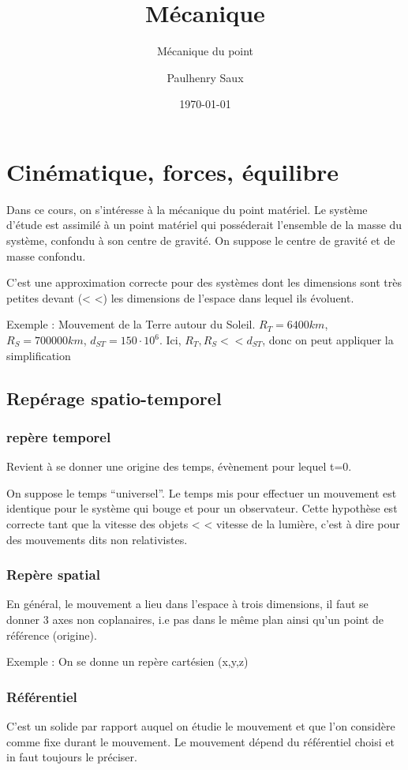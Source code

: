 \documentclass[french]{yLectureNote}
\title{Mécanique}
\subtitle{Mécanique du point}
\author{Paulhenry Saux}
\date{\today}
\begin{document}
\setcounter{chapter}{1}
	\chapter{Cinématique, forces, équilibre }
Dans ce cours, on s'intéresse à la mécanique du point matériel. Le système d'étude est assimilé à un point matériel qui posséderait l'ensemble de la masse du système, confondu à son centre de gravité. On suppose le centre de gravité et de masse confondu.

C'est une approximation correcte pour des systèmes dont les dimensions sont très petites devant (< <)  les dimensions de l'espace dans lequel ils évoluent.

Exemple : Mouvement de la Terre autour du Soleil. $R_T = 6400 km$, $R_S = 700 000 km$, $d_{ST} = 150\cdot 10^6$. Ici, $R_T, R_S << d_{ST}$, donc on peut appliquer la simplification

\section{Repérage spatio-temporel}
\subsection{repère temporel}
Revient à se donner une origine des temps, évènement pour lequel t=0.
\begin{theorem}[Hypothèse]
On suppose le temps ``universel''. Le temps mis pour effectuer un mouvement est identique pour le système qui bouge et pour un observateur. Cette hypothèse est correcte tant que la vitesse des objets < < vitesse de la lumière, c'est à dire pour des mouvements dits non relativistes.
\end{theorem}

\subsection{Repère spatial}
En général, le mouvement a lieu dans l'espace à trois dimensions, il faut se donner 3 axes non coplanaires, i.e pas dans le même plan ainsi qu'un point de référence (origine).

Exemple : On se donne un repère cartésien (x,y,z)

\subsection{Référentiel}

C'est un solide par rapport auquel on étudie le mouvement et que l'on considère comme fixe durant le mouvement. Le mouvement dépend du référentiel choisi et in faut toujours le préciser.
\end{document}
